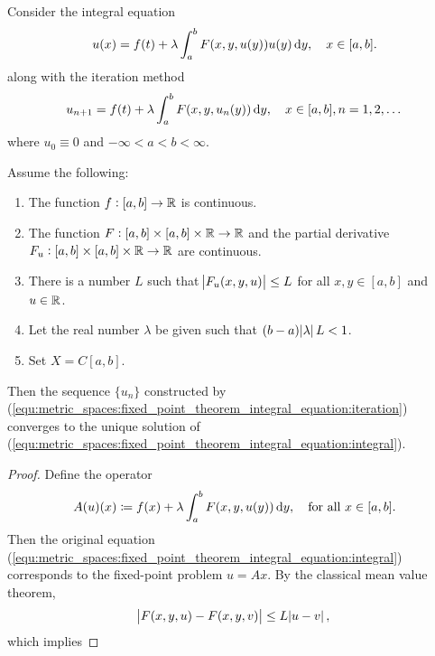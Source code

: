 \begin{example}
Consider the integral equation 
\begin{equation}
    \label{equ:metric_spaces:fixed_point_theorem_integral_equation:integral}
    u(x) = f(t) + \lambda \int_{a}^{b} F(x, y, u(y)) u(y) \mathop{}\!\mathrm{d} y, \quad 
    x \in [a, b].
\end{equation}
along with the iteration method 
\begin{equation}
    \label{equ:metric_spaces:fixed_point_theorem_integral_equation:iteration}
    u_{n + 1} = f(t) + \lambda \int_{a}^{b} F(x, y, u_n(y)) \mathop{}\!\mathrm{d} y, \quad 
    x \in [a, b], n = 1, 2, \dots
\end{equation}
where $u_0 \equiv 0$ and $-\infty < a < b < \infty$. 
\begin{thm}
Assume the following:
\begin{enumerate}
    \item The function $f: [a, b] \to \mathbb{R}$ is continuous. 
    \item The function $F: [a, b] \times [a, b] \times \mathbb{R} \to \mathbb{R}$ and the 
    partial derivative $F_u: [a, b] \times [a, b] \times \mathbb{R} \to 
    \mathbb{R}$ are continuous. 
    \item There is a number $L$ such that $\abs{F_u(x, y, u)} \le L$ for all 
    $x, y \in [a, b]$ and $u \in \mathbb{R}$. 
    \item Let the real number $\lambda$ be given such that $(b - a) 
    \abs{\lambda} L < 1$. 
    \item Set $X = C[a, b]$. 
\end{enumerate}
Then the sequence $\{u_n\}$ constructed by 
(\ref{equ:metric_spaces:fixed_point_theorem_integral_equation:iteration}) 
converges to the unique solution of 
(\ref{equ:metric_spaces:fixed_point_theorem_integral_equation:integral}).
\end{thm}
\begin{proof}
Define the operator 
\begin{equation*}
    A(u)(x) \coloneqq f(x) + \lambda \int_{a}^{b} F(x, y, u(y)) \mathop{}\!\mathrm{d} y, \quad
    \text{for all } x \in [a, b]. 
\end{equation*}
Then the original equation 
(\ref{equ:metric_spaces:fixed_point_theorem_integral_equation:integral}) 
corresponds to the fixed-point problem $u = Ax$. 
By the classical mean value theorem, 
\begin{equation*}
    \abs{F(x, y, u) - F(x, y, v)} \le L \abs{u - v}, 
\end{equation*}
which implies 

\end{proof}
\end{example}
